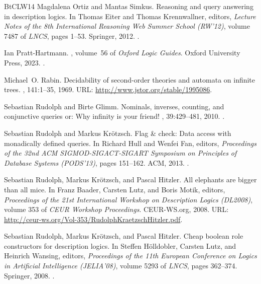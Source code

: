 \documentclass[10pt,a4paper]{amsart}
\theoremstyle{definition}
\numberwithin{equation}{section}
\theoremstyle{plain}
\theoremstyle{definition}
\theoremstyle{myexample}
\theoremstyle{plain}
\theoremstyle{definition}
\begin{document}
\begin{thebibliography}{BtCLW14}
Magdalena Ortiz and Mantas Simkus.
\newblock Reasoning and query answering in description logics.
\newblock In Thomas Eiter and Thomas Krennwallner, editors, {\em Lecture Notes
  of the 8th International Reasoning Web Summer School (RW'12)}, volume 7487 of
  {\em LNCS}, pages 1--53. Springer, 2012.
\newblock \href {https://doi.org/10.1007/978-3-642-33158-9_1}
  {}.

Ian Pratt-Hartmann.
, volume~56 of {\em Oxford Logic
  Guides}.
\newblock Oxford University Press, 2023.
\newblock \href {https://doi.org/10.1093/oso/9780192867964.001.0001}
  {}.

Michael~O. Rabin.
\newblock Decidability of second-order theories and automata on infinite trees.
, 141:1--35,
  1969.
\newblock URL: \url{http://www.jstor.org/stable/1995086}.

Sebastian Rudolph and Birte Glimm.
\newblock Nominals, inverses, counting, and conjunctive queries or: Why
  infinity is your friend!
, 39:429--481, 2010.
\newblock \href {https://doi.org/10.1613/jair.3029}
  {}.

Sebastian Rudolph and Markus Kr{\"{o}}tzsch.
\newblock Flag {\&} check: {D}ata access with monadically defined queries.
\newblock In Richard Hull and Wenfei Fan, editors, {\em Proceedings of the 32nd
  {ACM} {SIGMOD-SIGACT-SIGART} Symposium on Principles of Database Systems
  (PODS'13)}, pages 151--162. {ACM}, 2013.
\newblock \href {https://doi.org/10.1145/2463664.2465227}
  {}.

Sebastian Rudolph, Markus Kr{\"{o}}tzsch, and Pascal Hitzler.
\newblock All elephants are bigger than all mice.
\newblock In Franz Baader, Carsten Lutz, and Boris Motik, editors, {\em
  Proceedings of the 21st International Workshop on Description Logics
  (DL2008)}, volume 353 of {\em {CEUR} Workshop Proceedings}. CEUR-WS.org,
  2008.
\newblock URL: \url{http://ceur-ws.org/Vol-353/RudolphKraetzschHitzler.pdf}.

Sebastian Rudolph, Markus Kr{\"{o}}tzsch, and Pascal Hitzler.
\newblock Cheap boolean role constructors for description logics.
\newblock In Steffen H{\"{o}}lldobler, Carsten Lutz, and Heinrich Wansing,
  editors, {\em Proceedings of the 11th European Conference on Logics in
  Artificial Intelligence (JELIA'08)}, volume 5293 of {\em LNCS}, pages
  362--374. Springer, 2008.
\newblock \href {https://doi.org/10.1007/978-3-540-87803-2_30}
  {}.


\end{thebibliography}
\end{document}
